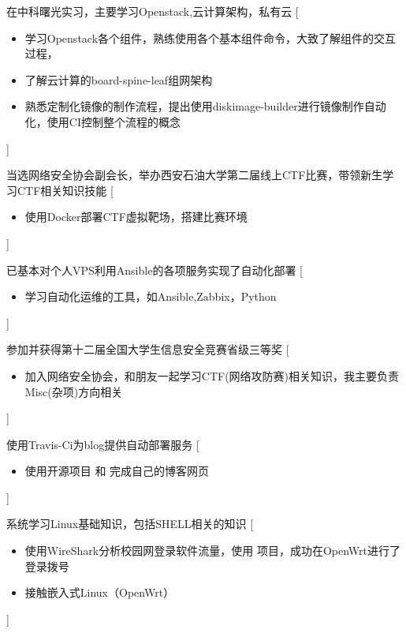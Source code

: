 \documentclass[zh]{resume}
\begin{document}
\begin{experiences}
  {在中科曙光实习，主要学习Openstack,云计算架构，私有云}%
  [\begin{itemize}
    \item 学习Openstack各个组件，熟练使用各个基本组件命令，大致了解组件的交互过程，
    \item 了解云计算的board-spine-leaf组网架构
    \item 熟悉定制化镜像的制作流程，提出使用diskimage-builder进行镜像制作自动化，使用CI控制整个流程的概念
  \end{itemize}
  ]
  
  \separator{0.5ex}
  {当选网络安全协会副会长，举办西安石油大学第二届线上CTF比赛，带领新生学习CTF相关知识技能}%
  [\begin{itemize}
    \item 使用Docker部署CTF虚拟靶场，搭建比赛环境
  \end{itemize}
  ]

  \separator{0.5ex}
  {已基本对个人VPS利用Ansible的各项服务实现了自动化部署 }%
  [\begin{itemize}
    \item 学习自动化运维的工具，如Ansible,Zabbix，Python
  \end{itemize}
  ]
  
  \separator{0.5ex}
  {参加并获得第十二届全国大学生信息安全竞赛省级三等奖}%
  [\begin{itemize}
    \item 加入网络安全协会，和朋友一起学习CTF(网络攻防赛)相关知识，我主要负责Misc(杂项)方向相关
  \end{itemize}
  ]

\separator{0.5ex}
%
{使用Travis-Ci为blog提供自动部署服务}%
[\begin{itemize}
\item 使用开源项目  和  
完成自己的博客网页
\end{itemize}]

\separator{0.5ex}
%
{系统学习Linux基础知识，包括SHELL相关的知识}%
[\begin{itemize}
\item 使用WireShark分析校园网登录软件流量，使用  项目，成功在OpenWrt进行了登录拨号
\item 接触嵌入式Linux（OpenWrt）
\end{itemize}]
\end{experiences}
\end{document}
